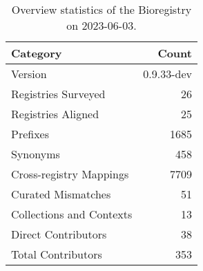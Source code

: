 \begin{table}
\caption{Overview statistics of the Bioregistry on 2023-06-03.}
\label{tab:bioregistry-summary}
\begin{tabular}{lr}
\toprule
Category & Count \\
\midrule
Version & 0.9.33-dev \\
Registries Surveyed & 26 \\
Registries Aligned & 25 \\
Prefixes & 1685 \\
Synonyms & 458 \\
Cross-registry Mappings & 7709 \\
Curated Mismatches & 51 \\
Collections and Contexts & 13 \\
Direct Contributors & 38 \\
Total Contributors & 353 \\
\bottomrule
\end{tabular}
\end{table}
